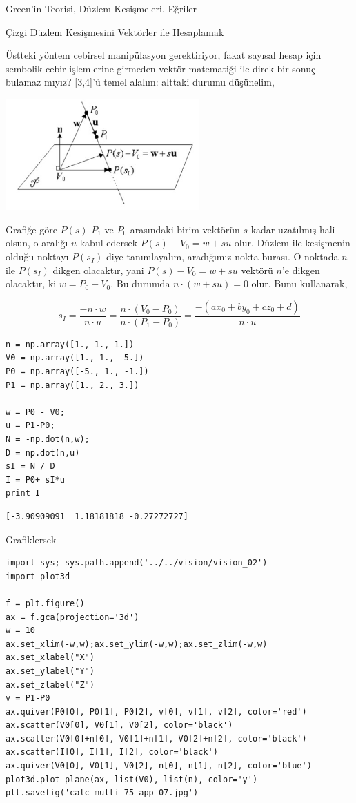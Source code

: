 \documentclass[12pt,fleqn]{article}\usepackage{../../common}
\begin{document}
Green'in Teorisi, Düzlem Kesişmeleri, Eğriler

Çizgi Düzlem Kesişmesini Vektörler ile Hesaplamak

Üstteki yöntem cebirsel manipülasyon gerektiriyor, fakat sayısal hesap için
sembolik cebir işlemlerine girmeden vektör matematiği ile direk bir sonuç
bulamaz mıyız? [3,4]'ü temel alalım: alttaki durumu düşünelim, 

\includegraphics[width=20em]{calc_multi_75_app_06.jpg}

Grafiğe göre $P(s)$ $P_1$ ve $P_0$ arasındaki birim vektörün $s$ kadar
uzatılmış hali olsun, o aralığı $u$ kabul edersek $P(s)-V_0 = w + su$
olur. Düzlem ile kesişmenin olduğu noktayı $P(s_I)$ diye tanımlayalım,
aradığımız nokta burası. O noktada $n$ ile $P(s_I)$ dikgen olacaktır, yani
$P(s) - V_0 = w + su$ vektörü $n$'e dikgen olacaktır, ki $w=P_0-V_0$. Bu
durumda $n \cdot (w+su) = 0$ olur. Bunu kullanarak,

$$ s_I = \frac{-n \cdot w}{n \cdot u} = 
\frac{n \cdot (V_0 - P_0)}{n \cdot (P_1-P_0)} = 
\frac{-(ax_0 + by_0 + cz_0 + d)}{n \cdot u}
$$

\begin{verbatim}
n = np.array([1., 1., 1.])
V0 = np.array([1., 1., -5.])
P0 = np.array([-5., 1., -1.])
P1 = np.array([1., 2., 3.])

w = P0 - V0;
u = P1-P0;
N = -np.dot(n,w);
D = np.dot(n,u)
sI = N / D
I = P0+ sI*u
print I
\end{verbatim}

\begin{verbatim}
[-3.90909091  1.18181818 -0.27272727]
\end{verbatim}

Grafiklersek

\begin{verbatim}
import sys; sys.path.append('../../vision/vision_02')
import plot3d

f = plt.figure()
ax = f.gca(projection='3d')
w = 10
ax.set_xlim(-w,w);ax.set_ylim(-w,w);ax.set_zlim(-w,w)
ax.set_xlabel("X")
ax.set_ylabel("Y")
ax.set_zlabel("Z")
v = P1-P0
ax.quiver(P0[0], P0[1], P0[2], v[0], v[1], v[2], color='red')
ax.scatter(V0[0], V0[1], V0[2], color='black')
ax.scatter(V0[0]+n[0], V0[1]+n[1], V0[2]+n[2], color='black')
ax.scatter(I[0], I[1], I[2], color='black')
ax.quiver(V0[0], V0[1], V0[2], n[0], n[1], n[2], color='blue')
plot3d.plot_plane(ax, list(V0), list(n), color='y')
plt.savefig('calc_multi_75_app_07.jpg')
\end{verbatim}
\end{document}

